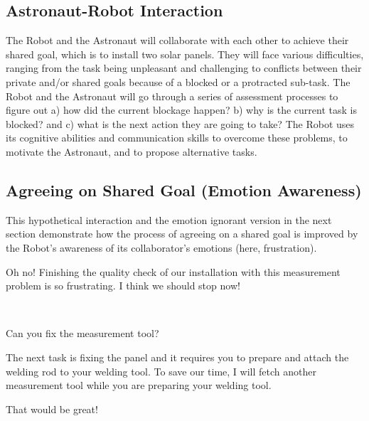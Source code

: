 \subsection{Astronaut-Robot Interaction}

The Robot and the Astronaut will collaborate with each other to achieve their
shared goal, which is to install two solar panels. They will face various
difficulties, ranging from the task being unpleasant and challenging to
conflicts between their private and/or shared goals because of a blocked or a
protracted sub-task. The Robot and the Astronaut will go through a series of
assessment processes to figure out a) how did the current blockage happen? b)
why is the current task is blocked? and c) what is the next action they are
going to take? The Robot uses its cognitive abilities and communication skills
to overcome these problems, to motivate the Astronaut, and to propose
alternative tasks.

\subsection{Agreeing on Shared Goal (Emotion Awareness)}
\label{sec:exp1}

This hypothetical interaction and the emotion ignorant version in the next
section demonstrate how the process of agreeing on a shared goal is improved by
the Robot's awareness of its collaborator's emotions (here, frustration).

\begin{description}
  \item \textit{\textbf{\fontsize{9pt}{12pt}\selectfont{A1. Astronaut:}}} Oh
  no! Finishing the quality check of our installation with this measurement
  problem is so frustrating. I think we should stop now!\\

  \item {}\\
  
  \item \textit{\textbf{\fontsize{9pt}{12pt}\selectfont{A3. Astronaut:}}} Can
  you fix the measurement tool?\\

  \item \textit{\textbf{\fontsize{9pt}{12pt}\selectfont{A4. Robot:}}} The next
  task is fixing the panel and it requires you to prepare and attach the welding
  rod to your welding tool. To save our time, I will fetch another measurement
  tool while you are preparing your welding tool.\\

  \item \textit{\textbf{\fontsize{9pt}{12pt}\selectfont{A5. Astronaut:}}} That
  would be great!
  
\end{description}

